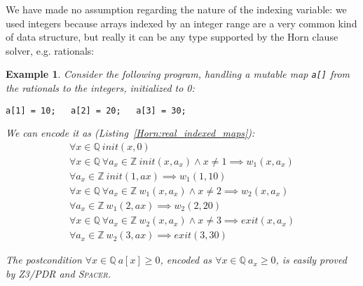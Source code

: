 \documentclass[a4paper]{article}
\newcommand{\ZZ}{\mathbb{Z}}
\newcommand{\QQ}{\mathbb{Q}}
\newcommand{\soft}[1]{\textsc{#1}}
\theoremstyle{definition}
\theoremstyle{plain}
\newtheorem{example}{Example}
\begin{document}
We have made no assumption regarding the nature of the indexing variable: we used integers because arrays indexed by an integer range are a very common kind of data structure, but really it can be any type supported by the Horn clause solver, e.g. rationals:

\begin{example}
Consider the following program, handling a mutable map \lstinline|a[]| from the rationals to the integers, initialized to 0:
\begin{lstlisting}
a[1] = 10;   a[2] = 20;   a[3] = 30;
\end{lstlisting}

We can encode it as (Listing~\ref{Horn:real_indexed_maps}):
\begin{align}
\forall x \in \QQ~ \mathit{init}(x, 0)\\
\forall x \in \QQ~ \forall a_x \in \ZZ~
  \mathit{init}(x, a_x) \land x\neq 1 \implies \mathit{w}_1(x, a_x)\\
\forall a_x \in \ZZ~
  \mathit{init}(1, ax) \implies \mathit{w}_1(1, 10)\\
\forall x \in \QQ~ \forall a_x \in \ZZ~
  \mathit{w}_1(x, a_x) \land x\neq 2 \implies \mathit{w}_2(x, a_x)\\
\forall a_x \in \ZZ~
  \mathit{w}_1(2, ax) \implies \mathit{w}_2(2, 20)\\
\forall x \in \QQ~ \forall a_x \in \ZZ~
  \mathit{w}_2(x, a_x) \land x\neq 3 \implies \mathit{exit}(x, a_x)\\
\forall a_x \in \ZZ~
  \mathit{w}_2(3, ax) \implies \mathit{exit}(3, 30)
\end{align}

The postcondition $\forall x\in \QQ~ a[x] \geq 0$, encoded as $\forall x\in \QQ~ a_x \geq 0$, is easily proved by \soft{Z3/PDR} and \soft{Spacer}.
\end{example}
\end{document}
